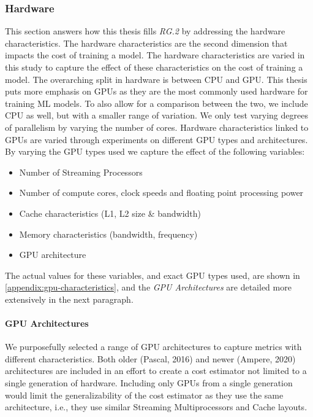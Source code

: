 \subsubsection{Hardware}
\label{subsubsec:4-hardware}
This section answers how this thesis fills \emph{RG.2} by addressing the hardware characteristics. The hardware characteristics are the second dimension that impacts the cost of training a model. The hardware characteristics are varied in this study to capture the effect of these characteristics on the cost of training a model. The overarching split in hardware is between CPU and GPU. This thesis puts more emphasis on GPUs as they are the most commonly used hardware for training ML models. To also allow for a comparison between the two, we include CPU as well, but with a smaller range of variation. We only test varying degrees of parallelism by varying the number of cores. Hardware characteristics linked to GPUs are varied through experiments on different GPU types and architectures. By varying the GPU types used we capture the effect of the following variables:
\begin{itemize}
  \item Number of Streaming Processors
  \item Number of compute cores, clock speeds and floating point processing power
  \item Cache characteristics (L1, L2 size \& bandwidth)
  \item Memory characteristics (bandwidth, frequency)
  \item GPU architecture
\end{itemize}
The actual values for these variables, and exact GPU types used, are shown in \autoref{appendix:gpu-characteristics}, and the \textit{GPU Architectures} are detailed more extensively in the next paragraph.

\paragraph{GPU Architectures}
We purposefully selected a range of GPU architectures to capture metrics with different characteristics. Both older (Pascal, 2016) and newer (Ampere, 2020) architectures are included in an effort to create a cost estimator not limited to a single generation of hardware. Including only GPUs from a single generation would limit the generalizability of the cost estimator as they use the same architecture, i.e., they use similar Streaming Multiprocessors and Cache layouts.


